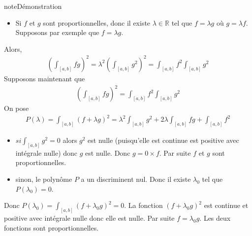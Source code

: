 \documentclass[letterpaper,10pt,french]{jupyterBook}
\begin{document}
\begin{sphinxadmonition}{note}{Démonstration}
\begin{itemize}
\item {} 
\sphinxAtStartPar
Si \(f\) et \(g\) sont proportionnelles, donc il existe \(\lambda \in \mathbb R\) tel que \(f=\lambda g\) où  \(g=\lambda f\). Supposons par exemple que \(f=\lambda g\).

\end{itemize}

\sphinxAtStartPar
Alors,
\begin{equation*}
\begin{split}
\left(\int_{[a, b]} fg \right)^2 = \lambda^2\left(\int_{[a, b]} g^2\right)^2 = \int_{[a, b]} f^2\int_{[a, b]} g^2
\end{split}
\end{equation*}
\sphinxAtStartPar
Supposons maintenant que
\begin{equation*}
\begin{split}
\left (\int_{[a, b]}fg \right ) ^2 = \int_{[a, b]} f^2 \int_{[a, b]}g^2
\end{split}
\end{equation*}
\sphinxAtStartPar
On pose
\begin{equation*}
\begin{split}
P(\lambda) = \int_{[a, b]}(f+\lambda g)^2 = \lambda^2\int_{[a, b]}g^2 + 2\lambda \int_{[a, b]}fg + \int_{[a, b]}f^2
\end{split}
\end{equation*}\begin{itemize}
\item {} 
\sphinxAtStartPar
\(si \int_{[a, b]}g^2 = 0\) alors \(g^2\) est nulle (puisqu’elle est continue est positive avec intégrale nulle) donc \(g\) est nulle. Donc \(g= 0\times f\). Par suite \(f\) et \(g\) sont proportionnelles.

\item {} 
\sphinxAtStartPar
sinon, le polynôme \(P\) a un discriminent nul. Donc il existe \(\lambda_0\) tel que \(P(\lambda_0)=0\).

\end{itemize}

\sphinxAtStartPar
Donc \(P(\lambda_0) = \int_{[a, b]}(f+\lambda_0 g)^2 = 0\). La fonction \((f+\lambda_0 g)^2\) est continue et positive avec intégrale nulle donc elle est nulle. Par suite \(f=\lambda_0 g\). Les deux fonctions sont proportionnelles.
\end{sphinxadmonition}
\end{document}
